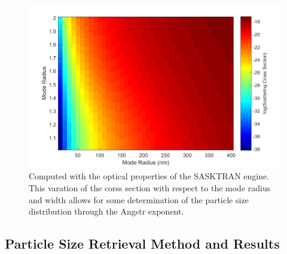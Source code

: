 \begin{figure}
\centering
\includegraphics[width=1.0\textwidth]{./Images/5-4-CrossSectionDependance.pdf}
    \caption[Log of Scatting Cross Section for Various Mode Radii and Widths]{Computed with the optical properties of the SASKTRAN engine. This varation of the corss section with respect to the mode radius and width allows for some determination of the particle size distribution through the Angstr exponent.}
    \label{fig:5.4:scatteringCrossSections}
\end{figure}

\subsection{Particle Size Retrieval Method and Results}


